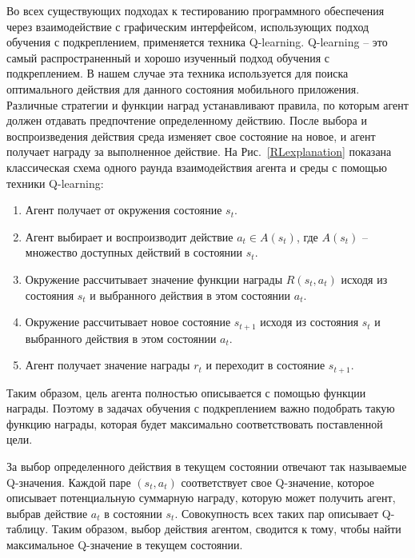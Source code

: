 Во всех существующих подходах к тестированию программного обеспечения через взаимодействие с графическим интерфейсом, использующих подход обучения с подкреплением, применяется техника Q-learning. Q-learning -- это самый распространенный и хорошо изученный подход обучения с подкреплением. В нашем случае эта техника используется для поиска оптимального действия для данного состояния мобильного приложения. Различные стратегии и функции наград устанавливают правила, по которым агент должен отдавать предпочтение определенному действию. После выбора и воспроизведения действия среда изменяет свое состояние на новое, и агент получает награду за выполненное действие. На Рис.~\ref{RLexplanation} показана классическая схема одного раунда взаимодействия агента и среды с помощью техники Q-learning:

\begin{enumerate} 

\item Агент получает от окружения состояние $s_t$.

\item Агент выбирает и воспроизводит действие $a_t \in A(s_t)$, где $A(s_t)$ -- множество доступных действий в состоянии $s_t$.

\item Окружение рассчитывает значение функции награды $R(s_t, a_t)$ исходя из состояния $s_t$ и выбранного действия в этом состоянии $a_t$.

\item Окружение рассчитывает новое состояние $s_{t+1}$ исходя из состояния $s_t$ и выбранного действия в этом состоянии $a_t$.

\item Агент получает значение награды $r_t$ и переходит в состояние $s_{t+1}$.

\end{enumerate}

Таким образом, цель агента полностью описывается с помощью функции награды. Поэтому в задачах обучения с подкреплением важно подобрать такую функцию награды, которая будет максимально соответствовать поставленной цели.

За выбор определенного действия в текущем состоянии отвечают так называемые Q-значения. Каждой паре $(s_t, a_t)$ соответствует свое Q-значение, которое описывает потенциальную суммарную награду, которую может получить агент, выбрав действие $a_t$ в состоянии $s_t$. Совокупность всех таких пар описывает Q-таблицу. Таким образом, выбор действия агентом, сводится к тому, чтобы найти максимальное Q-значение в текущем состоянии.

